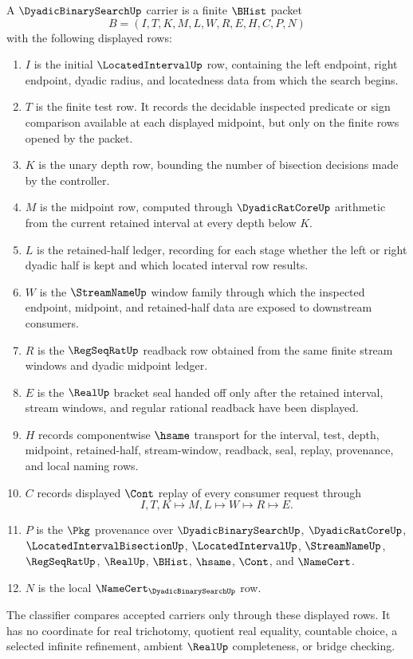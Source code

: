 \begin{definition}
\label{def:dyadic-binary-search-carrier}
A $\DyadicBinarySearchUp$ carrier is a finite $\BHist$ packet
$$
B=(I,T,K,M,L,W,R,E,H,C,P,N)
$$
with the following displayed rows:
\begin{enumerate}
\item $I$ is the initial $\LocatedIntervalUp$ row, containing the left endpoint, right endpoint, dyadic radius, and locatedness data from which the search begins.
\item $T$ is the finite test row. It records the decidable inspected predicate or sign comparison available at each displayed midpoint, but only on the finite rows opened by the packet.
\item $K$ is the unary depth row, bounding the number of bisection decisions made by the controller.
\item $M$ is the midpoint row, computed through $\DyadicRatCoreUp$ arithmetic from the current retained interval at every depth below $K$.
\item $L$ is the retained-half ledger, recording for each stage whether the left or right dyadic half is kept and which located interval row results.
\item $W$ is the $\StreamNameUp$ window family through which the inspected endpoint, midpoint, and retained-half data are exposed to downstream consumers.
\item $R$ is the $\RegSeqRatUp$ readback row obtained from the same finite stream windows and dyadic midpoint ledger.
\item $E$ is the $\RealUp$ bracket seal handed off only after the retained interval, stream windows, and regular rational readback have been displayed.
\item $H$ records componentwise $\hsame$ transport for the interval, test, depth, midpoint, retained-half, stream-window, readback, seal, replay, provenance, and local naming rows.
\item $C$ records displayed $\Cont$ replay of every consumer request through
$$
I,T,K\longmapsto M,L\longmapsto W\longmapsto R\longmapsto E .
$$
\item $P$ is the $\Pkg$ provenance over $\DyadicBinarySearchUp$, $\DyadicRatCoreUp$, $\LocatedIntervalBisectionUp$, $\LocatedIntervalUp$, $\StreamNameUp$, $\RegSeqRatUp$, $\RealUp$, $\BHist$, $\hsame$, $\Cont$, and $\NameCert$.
\item $N$ is the local $\NameCert_{\DyadicBinarySearchUp}$ row.
\end{enumerate}
The classifier compares accepted carriers only through these displayed rows. It has no coordinate for real trichotomy, quotient real equality, countable choice, a selected infinite refinement, ambient $\RealUp$ completeness, or bridge checking.
\end{definition}

